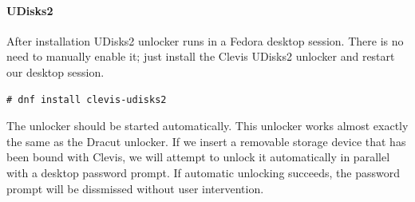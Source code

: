 \paragraph{UDisks2}\label{udisk2}
After installation UDisks2 unlocker runs in a Fedora desktop session.
There is no need to manually enable it; just install the Clevis UDisks2 unlocker and restart our desktop session.
\begin{lstlisting}[columns=fixed,basicstyle=\ttfamily\footnotesize,tabsize=4,backgroundcolor=\color{yellow!10}]
# dnf install clevis-udisks2
\end{lstlisting}
The unlocker should be started automatically.
This unlocker works almost exactly the same as the Dracut unlocker.
If we insert a removable storage device that has been bound with Clevis, we will attempt to unlock it automatically in parallel with a desktop password prompt.
If automatic unlocking succeeds, the password prompt will be dissmissed without user intervention.
